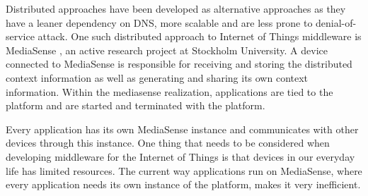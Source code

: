 Distributed approaches have been developed as alternative approaches as they have a leaner dependency on DNS, more scalable and are less prone to denial-of-service attack. One such distributed approach to Internet of Things middleware is MediaSense \cite{Kanter539187}, an active research project at Stockholm University. A device connected to MediaSense is responsible for receiving and storing the distributed context information as well as generating and sharing its own context information. Within the mediasense realization, applications are tied to the platform and are started and terminated with the platform. 

Every application has its own MediaSense instance and communicates with other devices through this instance. One thing that needs to be considered when developing middleware for the  Internet of Things is that devices in our everyday life has limited resources. The current way applications run on MediaSense, where every application needs its own instance of the platform, makes it very inefficient.